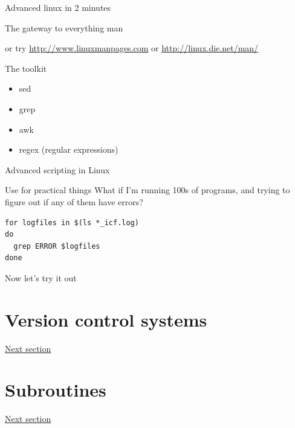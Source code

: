 \documentclass[xcolor=table,compress]{beamer}
\begin{document}
\begin{frame}{Advanced linux in 2 minutes}
\begin{block}{The gateway to everything}
{man}
\end{block}
or try \href{http://www.linuxmanpages.com}{http://www.linuxmanpages.com} or \href{http://linux.die.net/man/}{http://linux.die.net/man/}
\begin{block}{The toolkit}
\begin{itemize}
\item sed
\item grep
\item awk
\item regex (regular expressions)
\end{itemize}
\end{block}
\end{frame}


\begin{frame}[fragile]{Advanced scripting in Linux}
\begin{block}{Use for practical things}
What if I'm running 100s of programs, and trying to figure out
if any of them have errors?
\begin{lstlisting}
for logfiles in $(ls *_icf.log)
do
  grep ERROR $logfiles
done
\end{lstlisting}
\end{block}
\end{frame}





\begin{frame}
Now let's try it out
\end{frame}

\section[VCS]{Version control systems}
\begin{frame}
\href{day1-2.pdf}{Next section}
\end{frame}

\section{Subroutines}
\begin{frame}
\href{day1-3.pdf}{Next section}
\end{frame}
\end{document}
